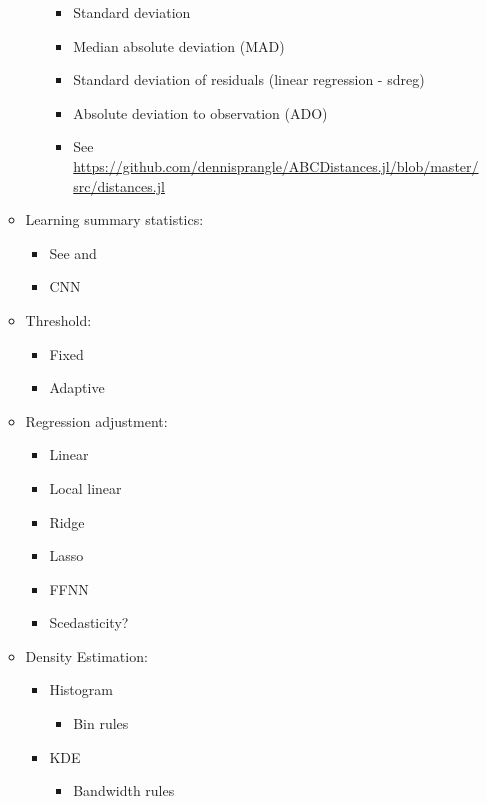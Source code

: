 \begin{enumerate}
\begin{itemize}
\begin{itemize}
            \begin{itemize}
                \item Standard deviation 
                \item Median absolute deviation (MAD)
                \item Standard deviation of residuals (linear regression - sdreg)
                \item Absolute deviation to observation (ADO)
                \item See \url{https://github.com/dennisprangle/ABCDistances.jl/blob/master/src/distances.jl}
            \end{itemize}
        \end{itemize}
        \item Learning summary statistics:
        \begin{itemize}
            \item See  and  
            \item CNN 
        \end{itemize}
        \item Threshold:
        \begin{itemize}
            \item Fixed
            \item Adaptive
        \end{itemize}
        \item Regression adjustment:
        \begin{itemize}
            \item Linear
            \item Local linear
            \item Ridge
            \item Lasso 
            \item FFNN
            \item Scedasticity? 
        \end{itemize}
        \item Density Estimation:
        \begin{itemize}
            \item Histogram
            \begin{itemize}
                \item Bin rules
            \end{itemize}
            \item KDE
            \begin{itemize}
                \item Bandwidth rules

\end{itemize}
\end{itemize}
\end{itemize}
\end{enumerate}
